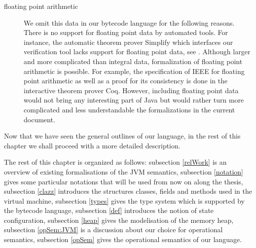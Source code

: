 \begin{description}
   \item [floating point arithmetic] We omit this data in our bytecode language for the following reasons.
	 There is no support for floating point data by automated tools.  
	 For instance, the automatic theorem prover Simplify which interfaces our verification tool
	 lacks support for floating point data, see  \cite{ESC2000LNS}. 
	 Although larger and more complicated than integral data, formalization of floating point arithmetic is possible. 
	 For example, the specification of IEEE  \cite{DRT03GLF} for floating point
	 arithmetic as well as a proof for its consistency  is done in the interactive
	 theorem prover Coq. 
	 However, including floating point data would not
	 bring any interesting part of Java but would rather turn more complicated
	 and less understandable the formalizations in the current document.
	  
         
 \end{description}

 Now that we have seen the general outlines of our language,
 in the rest of this chapter we shall proceed with a more detailed description.



  
 The rest of this chapter is organized as follows:
 subsection \ref{relWork} is an overview of existing formalisations of the JVM semantics,
 subsection \ref{notation} gives some particular notations that will be used from now on along the thesis,
 subsection \ref{clazz} introduces the structures classes, fields and methods  used in the virtual machine, 
 subsection \ref{types} gives the type system which is supported by the bytecode language,
 subsection \ref{def} introduces the notion of state configuration,
 subsection \ref{heap} gives the modelisation of the memory heap,
 subsection \ref{opSem:JVM} is a discussion about our choice for operational semantics,
 subsection \ref{opSem} gives the operational semantics of our language.

